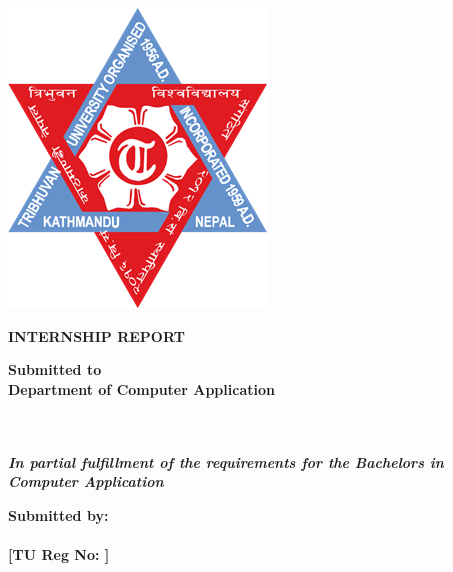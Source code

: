 \begin{titlepage}
    \centering
    {\fontsize{16}{19}\bfseries {}} \\
    {\fontsize{16}{19}\bfseries {}} \\

    \vspace{1.5cm}
    \includegraphics[scale=0.3]{contents/frontmatter/images/tu-logo.png} \\ 
    \vspace{1.5cm}

    {\fontsize{16}{19}\bfseries 
       \ProjectTitleCaps
     }\par

    {\fontsize{14}{17}\bfseries INTERNSHIP REPORT} \\

    \vspace{1.5cm}

    {\fontsize{14}{17}\bfseries Submitted to} \\
    {\fontsize{14}{17}\bfseries Department of Computer Application} \\
    {\fontsize{14}{17}\bfseries {}} \\
    {\fontsize{14}{17}\bfseries {}} \\

    \vspace{1.5cm}

    {\fontsize{14}{14}\bfseries \textit{In partial fulfillment of the requirements for the Bachelors in Computer Application}} \\

    \vspace{1.5cm}

    {\fontsize{14}{17}\bfseries Submitted by:} \\
    {\fontsize{14}{17}\bfseries {}} \\
    {\fontsize{14}{17}\bfseries [TU Reg No: ]} \\

    \vfill
    {\fontsize{14}{17}\bfseries {}} 
\end{titlepage}


